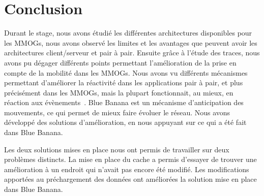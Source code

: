 \section{Conclusion}
	Durant le stage, nous avons étudié les différentes architectures disponibles pour les MMOGs, nous avons observé les limites et les avantages que peuvent avoir les architectures client/serveur et pair à pair. Ensuite grâce à l'étude des traces, nous avons pu dégager différents points permettant l'amélioration de la prise en compte de la mobilité dans les MMOGs. Nous avons vu différents mécanismes permettant d'améliorer la réactivité dans les applications pair à pair, et plus précisément dans les MMOGs, mais la plupart fonctionnait, au mieux, en réaction aux évènements~\cite{10.1109/SRDS.2006.33}. Blue Banana est un mécanisme d'anticipation des mouvements, ce qui permet de mieux faire évoluer le réseau. Nous avons développé des solutions d'amélioration, en nous appuyant sur ce qui a été fait dans Blue Banana.\\

	\par Les deux solutions mises en place nous ont permis de travailler sur deux problèmes distincts. La mise en place du cache a permis d'essayer de trouver une amélioration à un endroit qui n'avait pas encore été modifié. Les modifications apportées au préchargement des données ont améliorées la solution mise en place dans Blue Banana. 	

